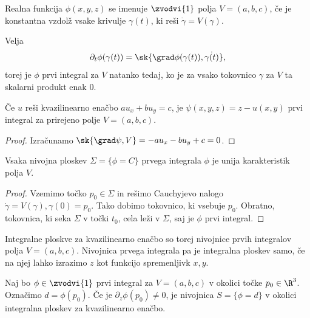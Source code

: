 
\begin{definicija}
  Realna funkcija $\phi(x, y, z)$ se imenuje  $\zvodvi{1}$
  polja $V = (a,b,c)$, če je konstantna vzdolž vsake krivulje $\gamma(t)$, ki
  reši $\dot{\gamma} = V(\gamma)$.
\end{definicija}


Velja
\[
  \partial_t \phi(\gamma(t)) = \sk{\grad \phi(\gamma(t)), \dot{\gamma(t)}},
\]
torej je $\phi$ prvi integral za $V$ natanko tedaj, ko je za vsako tokovnico
$\gamma$ za $V$ ta skalarni produkt enak $0$.

\begin{trditev}
  Če $u$ reši kvazilinearno enačbo $a u_x + b u_y = c$, je $\psi(x,y,z) = z -
  u(x,y)$ prvi integral za prirejeno polje $V = (a,b,c)$.
\end{trditev}

\begin{proof}
  Izračunamo $\sk{\grad \psi, V} = -au_x - b u_y + c = 0$.
\end{proof}

\begin{trditev}
  Vsaka nivojna ploskev $\Sigma = \{\phi = C\}$ prvega integrala $\phi$ je unija
  karakteristik polja $V$.
\end{trditev}

\begin{proof}
  Vzemimo točko $p_0 \in \Sigma$ in rešimo Cauchyjevo nalogo $\dot{\gamma} =
  V(\gamma), \gamma(0) = p_0$.
  Tako dobimo tokovnico, ki vsebuje $p_0$.
  Obratno, tokovnica, ki seka $\Sigma$ v točki $t_0$, cela leži v $\Sigma$, saj
  je $\phi$ prvi integral.
\end{proof}

Integralne ploskve za kvazilinearno enačbo so torej nivojnice prvih integralov
polja $V = (a,b,c)$.
Nivojnica prvega integrala pa je integralna ploskev samo, če na njej lahko
izrazimo $z$ kot funkcijo spremenljivk $x, y$.

\begin{trditev}
  Naj bo $\phi \in \zvodvi{1}$ prvi integral za $V = (a,b,c)$ v okolici točke
  $p_0 \in \R^3$.
  Označimo $d = \phi(p_0)$.
  Če je $\partial_z \phi(p_0) \ne 0$, je nivojnica $S = \{\phi = d\}$ v okolici
  integralna ploskev za kvazilinearno enačbo.
\end{trditev}

